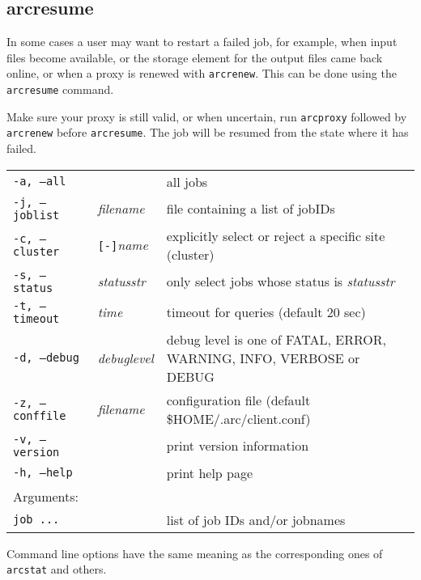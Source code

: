 \subsection{arcresume}
\label{sec:arcresume}

In some cases a user may want to restart a failed job, for example, when input
files become available, or the storage element for the output files came back
online, or when a proxy is renewed with \texttt{arcrenew}. This can be done using
the \texttt{arcresume} command.

\begin{framed}
Make sure your proxy is still valid, or when uncertain, run \verb#arcproxy# followed by
\verb#arcrenew# before \verb#arcresume#. The job will be resumed from the state where it has failed.
\end{framed}

\hspace*{0.5cm}
\begin{shaded}
\end{shaded}
\begin{longtable}{llp{8cm}}
   \texttt{-a, --all}& & all jobs\\
   \texttt{-j, --joblist}& \textit{filename} & file containing a list of jobIDs\\
   \texttt{-c, --cluster}&\verb#[-]#\textit{name}&explicitly select or reject a specific site (cluster)\\
   \texttt{-s, --status}& \textit{statusstr} &only select jobs whose status is \textit{statusstr}\\
   \texttt{-t, --timeout}& \textit{time} & timeout for queries (default 20 sec)\\
   \texttt{-d, --debug}& \textit{debuglevel}&debug level is one of  FATAL, ERROR, WARNING, INFO, VERBOSE or DEBUG\\
   \texttt{-z, --conffile}&\textit{filename}& configuration file (default {\$}HOME/.arc/client.conf)\\
   \texttt{-v, --version}& & print version information\\
   \texttt{-h, --help}& & print help page\\
   Arguments:&&\\
   \texttt{job ...} && list of job IDs and/or jobnames\\
\end{longtable}

Command line options have the same meaning as the corresponding ones of \verb#arcstat# and others.

